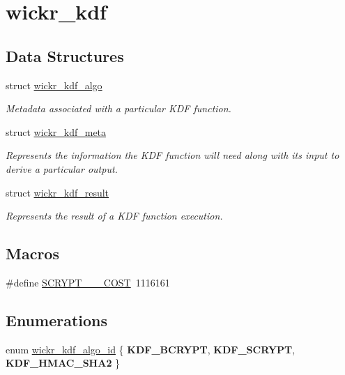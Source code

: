 \hypertarget{group__wickr__kdf}{}\section{wickr\+\_\+kdf}
\label{group__wickr__kdf}
\subsection*{Data Structures}
\begin{DoxyCompactItemize}
\item 
struct \mbox{\hyperlink{structwickr__kdf__algo}{wickr\+\_\+kdf\+\_\+algo}}
\begin{DoxyCompactList}\small\item\em Metadata associated with a particular K\+DF function. \end{DoxyCompactList}\item 
struct \mbox{\hyperlink{structwickr__kdf__meta}{wickr\+\_\+kdf\+\_\+meta}}
\begin{DoxyCompactList}\small\item\em Represents the information the K\+DF function will need along with it\textquotesingle{}s input to derive a particular output. \end{DoxyCompactList}\item 
struct \mbox{\hyperlink{structwickr__kdf__result}{wickr\+\_\+kdf\+\_\+result}}
\begin{DoxyCompactList}\small\item\em Represents the result of a K\+DF function execution. \end{DoxyCompactList}\end{DoxyCompactItemize}
\subsection*{Macros}
\begin{DoxyCompactItemize}
\item 
\#define \mbox{\hyperlink{group__wickr__kdf_ga5e8df13eb2cd5cc1e09f377675ddc50f}{S\+C\+R\+Y\+P\+T\+\_\+\_\+\_\+\+C\+O\+ST}}~1116161
\end{DoxyCompactItemize}
\subsection*{Enumerations}
\begin{DoxyCompactItemize}
\item 
enum \mbox{\hyperlink{group__wickr__kdf_ga106149e3507106abb6b5be843a4e7c16}{wickr\+\_\+kdf\+\_\+algo\+\_\+id}} \{ {\bfseries K\+D\+F\+\_\+\+B\+C\+R\+Y\+PT}, 
{\bfseries K\+D\+F\+\_\+\+S\+C\+R\+Y\+PT}, 
{\bfseries K\+D\+F\+\_\+\+H\+M\+A\+C\+\_\+\+S\+H\+A2}
 \}
\end{DoxyCompactItemize}
